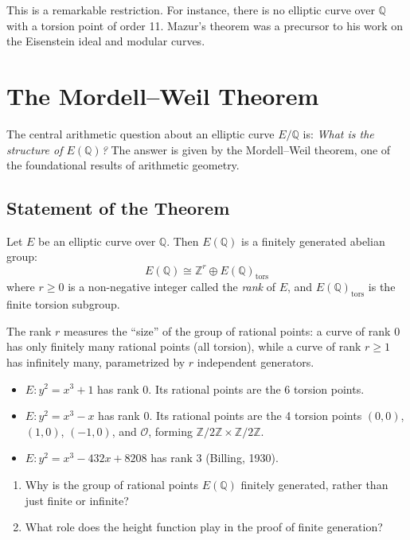 This is a remarkable restriction. For instance, there is no elliptic curve over $\mathbb{Q}$ with a torsion point of order 11. Mazur's theorem was a precursor to his work on the Eisenstein ideal and modular curves.

\section{The Mordell--Weil Theorem}
\label{sec:mordell-weil}

The central arithmetic question about an elliptic curve $E/\mathbb{Q}$ is: \emph{What is the structure of $E(\mathbb{Q})$?} The answer is given by the Mordell--Weil theorem, one of the foundational results of arithmetic geometry.

\subsection{Statement of the Theorem}

\begin{theorem}
Let $E$ be an elliptic curve over $\mathbb{Q}$. Then $E(\mathbb{Q})$ is a finitely generated abelian group:
\[
E(\mathbb{Q}) \cong \mathbb{Z}^r \oplus E(\mathbb{Q})_{\mathrm{tors}}
\]
where $r \ge 0$ is a non-negative integer called the \textit{rank} of $E$, and $E(\mathbb{Q})_{\mathrm{tors}}$ is the finite torsion subgroup.
\end{theorem}

The rank $r$ measures the ``size'' of the group of rational points: a curve of rank 0 has only finitely many rational points (all torsion), while a curve of rank $r \ge 1$ has infinitely many, parametrized by $r$ independent generators.

\begin{example}
\begin{itemize}
\item $E: y^2 = x^3 + 1$ has rank 0. Its rational points are the 6 torsion points.
\item $E: y^2 = x^3 - x$ has rank 0. Its rational points are the 4 torsion points $(0,0)$, $(1,0)$, $(-1,0)$, and $\mathcal{O}$, forming $\mathbb{Z}/2\mathbb{Z} \times \mathbb{Z}/2\mathbb{Z}$.
\item $E: y^2 = x^3 - 432x + 8208$ has rank 3 (Billing, 1930).
\end{itemize}
\end{example}

\begin{checkyou}
\begin{enumerate}
\item Why is the group of rational points $E(\mathbb{Q})$ finitely generated, rather than just finite or infinite?
\item What role does the height function play in the proof of finite generation?
\end{enumerate}
\end{checkyou}

